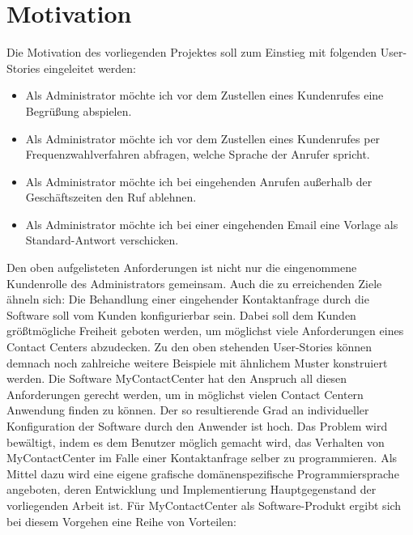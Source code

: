 \section{Motivation}
Die Motivation des vorliegenden Projektes soll zum Einstieg mit folgenden User-Stories eingeleitet werden:
\begin{itemize}
\item Als Administrator möchte ich vor dem Zustellen eines Kundenrufes eine Begrüßung abspielen.
\item Als Administrator möchte ich vor dem Zustellen eines Kundenrufes per Frequenzwahlverfahren abfragen, welche Sprache der Anrufer spricht.
\item Als Administrator möchte ich bei eingehenden Anrufen außerhalb der Ge\-schäftszeiten den Ruf ablehnen.
\item Als Administrator möchte ich bei einer eingehenden Email eine Vorlage als Standard-Antwort verschicken.
\end{itemize}
Den oben aufgelisteten Anforderungen ist nicht nur die eingenommene Kundenrolle des Administrators gemeinsam. Auch die zu erreichenden Ziele ähneln sich: Die Behandlung einer eingehender Kontaktanfrage durch die Software soll vom Kunden konfigurierbar sein. Dabei soll dem Kunden größtmögliche Freiheit geboten werden, um möglichst viele Anforderungen eines Contact Centers abzudecken. Zu den oben stehenden User-Stories können demnach noch zahlreiche weitere Beispiele mit ähnlichem Muster konstruiert werden. Die Software MyContactCenter hat den Anspruch all diesen Anforderungen gerecht werden, um in möglichst vielen Contact Centern Anwendung finden zu können. Der so resultierende Grad an individueller Konfiguration der Software durch den Anwender ist hoch. Das Problem wird bewältigt, indem es dem Benutzer möglich gemacht wird, das Verhalten von MyContactCenter im Falle einer Kontaktanfrage selber zu programmieren. Als Mittel dazu wird eine eigene grafische domänenspezifische Programmiersprache angeboten, deren Entwicklung und Implementierung Hauptgegenstand der vorliegenden Arbeit ist.
\newline
Für MyContactCenter als Software-Produkt ergibt sich bei diesem Vorgehen eine Reihe von Vorteilen:

